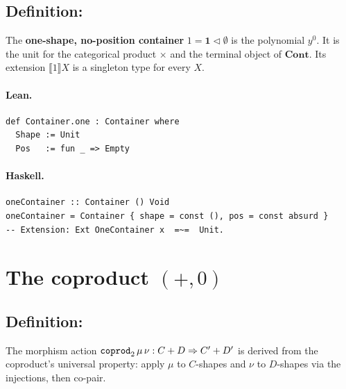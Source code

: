 \documentclass[11pt,a4paper]{article}
\begin{document}
\subsection{Definition: }

\begin{defn}
The \textbf{one-shape, no-position container} $1 = \mathbf{1} \triangleleft \emptyset$
is the polynomial $y^0$.  It is the unit for the categorical product $\times$
and the terminal object of $\mathbf{Cont}$.
Its extension $\llbracket 1 \rrbracket X$ is a singleton type for every $X$.
\end{defn}

\paragraph{Lean.}
\begin{lstlisting}[style=lean]
def Container.one : Container where
  Shape := Unit
  Pos   := fun _ => Empty
\end{lstlisting}

\paragraph{Haskell.}
\begin{lstlisting}[style=haskell]
oneContainer :: Container () Void
oneContainer = Container { shape = const (), pos = const absurd }
-- Extension: Ext OneContainer x  =~=  Unit.
\end{lstlisting}


\section{The coproduct \texorpdfstring{$(+, 0)$}{(+,0)}}

\subsection{Definition: }

\begin{defn}
The morphism action $\texttt{coprod}_2\,\mu\,\nu : C + D \Rightarrow C' + D'$
is derived from the coproduct's universal property: apply $\mu$ to $C$-shapes
and $\nu$ to $D$-shapes via the injections, then co-pair.
\end{defn}
\end{document}
